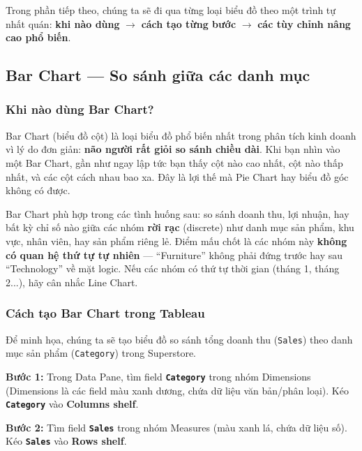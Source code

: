 \documentclass[12pt]{article}
\begin{document}
\noindent Trong phần tiếp theo, chúng ta sẽ đi qua từng loại biểu đồ theo một trình tự nhất quán: \textbf{khi nào dùng} $\rightarrow$ \textbf{cách tạo từng bước} $\rightarrow$ \textbf{các tùy chỉnh nâng cao phổ biến}.

\subsection{Bar Chart --- So sánh giữa các danh mục}

\subsubsection{Khi nào dùng Bar Chart?}

\noindent Bar Chart (biểu đồ cột) là loại biểu đồ phổ biến nhất trong phân tích kinh doanh vì lý do đơn giản: \textbf{não người rất giỏi so sánh chiều dài}. Khi bạn nhìn vào một Bar Chart, gần như ngay lập tức bạn thấy cột nào cao nhất, cột nào thấp nhất, và các cột cách nhau bao xa. Đây là lợi thế mà Pie Chart hay biểu đồ góc không có được.

\noindent Bar Chart phù hợp trong các tình huống sau: so sánh doanh thu, lợi nhuận, hay bất kỳ chỉ số nào giữa các nhóm \textbf{rời rạc} (discrete) như danh mục sản phẩm, khu vực, nhân viên, hay sản phẩm riêng lẻ. Điểm mấu chốt là các nhóm này \textbf{không có quan hệ thứ tự tự nhiên} --- ``Furniture'' không phải đứng trước hay sau ``Technology'' về mặt logic. Nếu các nhóm có thứ tự thời gian (tháng 1, tháng 2...), hãy cân nhắc Line Chart.

\subsubsection{Cách tạo Bar Chart trong Tableau}

\noindent Để minh họa, chúng ta sẽ tạo biểu đồ so sánh tổng doanh thu (\texttt{Sales}) theo danh mục sản phẩm (\texttt{Category}) trong Superstore.

\noindent \textbf{Bước 1:} Trong Data Pane, tìm field \textbf{\texttt{Category}} trong nhóm Dimensions (Dimensions là các field màu xanh dương, chứa dữ liệu văn bản/phân loại). Kéo \textbf{\texttt{Category}} vào \textbf{Columns shelf}.

\noindent \textbf{Bước 2:} Tìm field \textbf{\texttt{Sales}} trong nhóm Measures (màu xanh lá, chứa dữ liệu số). Kéo \textbf{\texttt{Sales}} vào \textbf{Rows shelf}.
\end{document}
